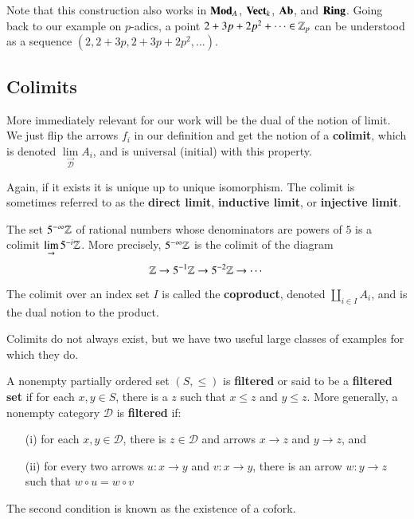 Note that this construction also works in $\normalfont\textbf{Mod}_A$, $\normalfont\textbf{Vect}_{k}$, $\normalfont\textbf{Ab}$, and $\normalfont\textbf{Ring}$. Going back to our example on $p$-adics, a point $2+3p+2p^2+\cdots \in \mathbb Z_p$ can be understood as a sequence $(2,2+3p,2+3p+2p^2,...)$.

\subsection{Colimits}

More immediately relevant for our work will be the dual of the notion of limit. We just flip the arrows $f_i$ in our definition and get the notion of a \textbf{colimit}, which is denoted $\lim\limits_{\overrightarrow{\mathscr{D}}}A_i$, and is universal (initial) with this property.
\begin{center}
\end{center}
Again, if it exists it is unique up to unique isomorphism. The colimit is sometimes referred to as the \textbf{direct limit}, \textbf{inductive limit}, or \textbf{injective limit}.

\begin{example}
    The set $5^{-\infty}\mathbb Z$ of rational numbers whose denominators are powers of $5$ is a colimit $\lim\limits_{\rightarrow}5^{-i}\mathbb Z$. More precisely, $5^{-\infty}\mathbb Z$ is the colimit of the diagram \begin{equation*}
        \mathbb Z\rightarrow 5^{-1}\mathbb Z\rightarrow 5^{-2}\mathbb Z\rightarrow \cdots
    \end{equation*}
\end{example}
The colimit over an index set $I$ is called the \textbf{coproduct}, denoted $\amalg_{i \in I}A_i$, and is the dual notion to the product.

Colimits do not always exist, but we have two useful large classes of examples for which they do.

\begin{definition}
    A nonempty partially ordered set $(S,\leq)$ is \textbf{filtered} or said to be a \textbf{filtered set} if for each $x,y \in S$, there is a $z$ such that $x \leq z$ and $y \leq z$. More generally, a nonempty category $\mathscr{D}$ is \textbf{filtered} if: \begin{itemize}
        \item[(i)] for each $x,y \in \mathscr{D}$, there is $z \in \mathscr{D}$ and arrows $x\rightarrow z$ and $y\rightarrow z$, and 
        \item[(ii)] for every two arrows $u:x\rightarrow y$ and $v:x\rightarrow y$, there is an arrow $w:y\rightarrow z$ such that $w\circ u = w\circ v$
    \end{itemize}
\end{definition}
The second condition is known as the existence of a cofork.

